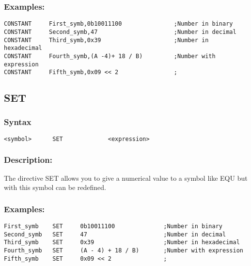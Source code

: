        \subsubsection{Examples:}
            {
                \usecodefont
                \verb'CONSTANT     First_symb,0b10011100               ;Number in binary'\\
                \verb'CONSTANT     Second_symb,47                      ;Number in decimal'\\
                \verb'CONSTANT     Third_symb,0x39                     ;Number in hexadecimal'\\
                \verb'CONSTANT     Fourth_symb,(A -4)+ 18 / B)         ;Number with expression'\\
                \verb'CONSTANT     Fifth_symb,0x09 << 2                ;'\\
            }

    \subsection{SET}
        \subsubsection{Syntax}
            {
                \usecodefont
                \verb'<symbol>      SET             <expression>'
            }

        \subsubsection{Description:}
            The directive SET allows you to give a numerical value to a symbol like EQU but with this symbol can be redefined.

        \subsubsection{Examples:}
            {
                \usecodefont
                \verb'First_symb    SET     0b10011100              ;Number in binary'\\
                \verb'Second_symb   SET     47                      ;Number in decimal'\\
                \verb'Third_symb    SET     0x39                    ;Number in hexadecimal'\\
                \verb'Fourth_symb   SET     (A - 4) + 18 / B)       ;Number with expression'\\
                \verb'Fifth_symb    SET     0x09 << 2               ;'\\
            }

